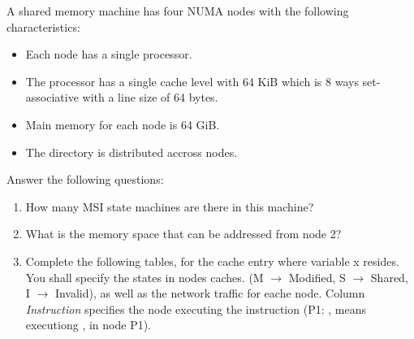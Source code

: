 \begin{acexercise}\end{acexercise}
A shared memory machine has four NUMA nodes with the following characteristics:

\begin{itemize}
  \item Each node has a single processor.
  \item The processor has a single cache level with 64 KiB which is 8 ways set-associative with a line size of 64 bytes.
  \item Main memory for each node is 64 GiB.
  \item The directory is distributed accross nodes.
\end{itemize}

Answer the following questions:

\begin{enumerate}

  \item How many MSI state machines are there in this machine?

  \item What is the memory space that can be addressed from node 2?

  \item Complete the following tables, for the cache entry where variable x resides.
        You shall specify the states in nodes caches.
        (M $\rightarrow$ Modified, S $\rightarrow$ Shared, I $\rightarrow$ Invalid), 
        as well as the network traffic for eache node.
        Column \emph{Instruction} specifies the node executing the instruction
        (P1: , means executiong
        , in node P1).

\end{enumerate}

